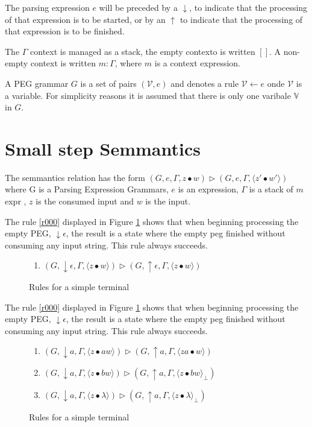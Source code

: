 \documentclass[manuscript, review, sigconf]{acmart}
\newcommand{\zpp}[2]{\langle #1\bullet #2 \rangle}
\newcommand{\zppf}[2]{\langle #1\bullet #2 \rangle_{\bot}}
\begin{document}
The parsing expression $e$ will be preceded by a $\downarrow$, to indicate that the processing of that expression is to be started, or by an $\uparrow$ to indicate that the processing of that expression is to be finished. 

The $\Gamma$ context is managed as a stack, the empty contexto is written $[]$. A non-empty context is written $m : \Gamma$, where $m$ is a context expression.  

A PEG grammar $G$ is a set of pairs $(\mathcal{V},e)$ and denotes a rule $\mathcal{V} \leftarrow e$ onde $\mathcal{V}$ is a variable. For simplicity reasons it is assumed that there is only one varibale $\mathbb{V}$ in $G$.  

\section{Small step Semmantics} \label{sec:sem}

The semmantics relation has the form $(G, e,\Gamma ,z \bullet w) \rhd (G, e, \Gamma, \zpp{z'}{w'})$ where G is a Parsing Expression Grammars, $e$ is an expression, $\Gamma$ is a stack of $m$ expr , $z$ is the consumed input and $w$ is the input.


The rule \ref{r000} displayed in Figure \ref{fig:rule-eps} shows that when beginning processing the empty PEG, $\downarrow \epsilon$, the result is a state where the empty peg finished without consuming any input string. This rule always succeeds.   

\begin{figure}[H]
\begin{enumerate}
  \item \label{r000} $(G, \downarrow \epsilon,\Gamma ,\zpp{z}{w})       \rhd  (G, \uparrow \epsilon, \Gamma, \zpp{z}{w})$ 
\end{enumerate}
 \caption{Rules for a simple terminal}
 \label{fig:rule-eps}
\end{figure}

The rule \ref{r000} displayed in Figure \ref{fig:rule-eps} shows that when beginning processing the empty PEG, $\downarrow \epsilon$, the result is a state where the empty peg finished without consuming any input string. This rule always succeeds.  

\begin{figure}[H]
\begin{enumerate}\addtocounter{enumi}{1}
  \item \label{r010} $(G, \downarrow a,\Gamma ,\zpp{z}{aw})       \rhd  (G, \uparrow a, \Gamma, \zpp{za}{w})$ 
  \item \label{r020} $(G, \downarrow a,\Gamma ,\zpp{z}{bw})       \rhd  (G, \uparrow a, \Gamma, \zppf{z}{bw})$ 
  \item \label{r030} $(G, \downarrow a,\Gamma ,\zpp{z}{\lambda})  \rhd  (G, \uparrow a, \Gamma, \zppf{z}{\lambda})$ 
\end{enumerate}
 \caption{Rules for a simple terminal}
 \label{fig:rule-simple}
\end{figure}
\end{document}
